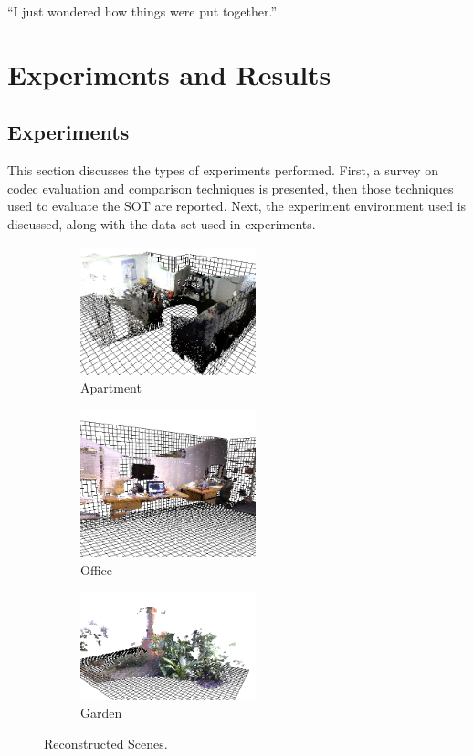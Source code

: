 \begin{savequote}[8cm]
  ``I just wondered how things were put together.''
\end{savequote}
\makeatletter
\chapter{Experiments and Results}

\section{Experiments}

This section discusses the types of experiments performed. First, a survey on codec evaluation and comparison techniques is presented, then those techniques used to evaluate the SOT are reported. Next, the experiment environment used is discussed, along with the data set used in experiments.

\begin{figure}[t] 
        \centering
        \begin{subfigure}[b]{2.0in}
                \includegraphics[width=2.0in]{images/ch2/unit21}
                \caption{Apartment}
                \label{fig:RECON_UNIT}
        \end{subfigure}%
        \begin{subfigure}[b]{2.0in}
                \includegraphics[width=2.0in]{images/ch2/officeA}
                \caption{Office}
                \label{fig:RECON_OFFICE}
        \end{subfigure}%
        \begin{subfigure}[b]{2.0in}
                \includegraphics[width=2.0in]{images/ch2/outdoorA}
                \caption{Garden}
                \label{fig:RECON_GARDEN}
        \end{subfigure}
       \caption{Reconstructed Scenes.}
       \label{fig:RECONSTRUCTIONS}
\end{figure}


